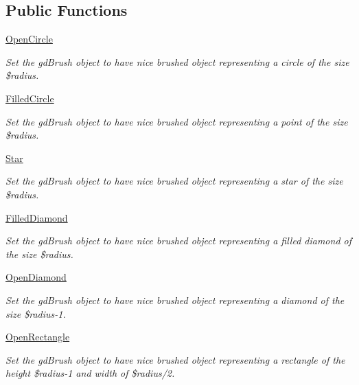 \subsection*{Public Functions}
\label{_amgrpda6bc86800313ecde6e56bd1b41a7c55}
 \begin{DoxyCompactItemize}
\item 
\hyperlink{classChart_1_1BrushStyles_adbd59ea91ba902a765fce4297a69b151}{OpenCircle}
\begin{DoxyCompactList}\small\item\em Set the gdBrush object to have nice brushed object representing a circle of the size \$radius. \item\end{DoxyCompactList}\item 
\hyperlink{classChart_1_1BrushStyles_af84643e28b62d5ddefaf36db4632824a}{FilledCircle}
\begin{DoxyCompactList}\small\item\em Set the gdBrush object to have nice brushed object representing a point of the size \$radius. \item\end{DoxyCompactList}\item 
\hyperlink{classChart_1_1BrushStyles_ae2f9c23e20ca5e9b329d5fe3630fc790}{Star}
\begin{DoxyCompactList}\small\item\em Set the gdBrush object to have nice brushed object representing a star of the size \$radius. \item\end{DoxyCompactList}\item 
\hyperlink{classChart_1_1BrushStyles_a2c807213b768f1a0941cbd7aebee7642}{FilledDiamond}
\begin{DoxyCompactList}\small\item\em Set the gdBrush object to have nice brushed object representing a filled diamond of the size \$radius. \item\end{DoxyCompactList}\item 
\hyperlink{classChart_1_1BrushStyles_affdd85acc56b6be6068c5cc960f9857c}{OpenDiamond}
\begin{DoxyCompactList}\small\item\em Set the gdBrush object to have nice brushed object representing a diamond of the size \$radius-\/1. \item\end{DoxyCompactList}\item 
\hyperlink{classChart_1_1BrushStyles_a3d17237567c35f8844e29e2bc7b03609}{OpenRectangle}
\begin{DoxyCompactList}\small\item\em Set the gdBrush object to have nice brushed object representing a rectangle of the height \$radius-\/1 and width of \$radius/2. \item\end{DoxyCompactList}\end{DoxyCompactItemize}


